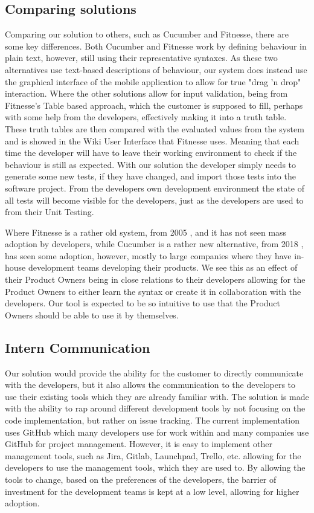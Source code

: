 \subsection{Comparing solutions}

Comparing our solution to others, such as Cucumber and Fitnesse, there are some key differences.
Both Cucumber and Fitnesse work by defining behaviour in plain text, however, still using their representative syntaxes.
As these two alternatives use text-based descriptions of behaviour, our system does instead use the graphical interface of the mobile application to allow for true "drag 'n drop" interaction.
Where the other solutions allow for input validation, being from Fitnesse's Table based approach, which the customer is supposed to fill, perhaps with some help from the developers, effectively making it into a truth table.
These truth tables are then compared with the evaluated values from the system and is showed in the Wiki User Interface that Fitnesse uses.
Meaning that each time the developer will have to leave their working environment to check if the behaviour is still as expected.
With our solution the developer simply needs to generate some new tests, if they have changed, and import those tests into the software project.
From the developers own development environment the state of all tests will become visible for the developers, just as the developers are used to from their Unit Testing.

Where Fitnesse is a rather old system, from 2005 \cite{FitnesseDownload}, and it has not seen mass adoption by developers, while Cucumber is a rather new alternative, from 2018 \cite{CucumberWiki}, has seen some adoption, however, mostly to large companies where they have in-house development teams developing their products.
We see this as an effect of their Product Owners being in close relations to their developers allowing for the Product Owners to either learn the syntax or create it in collaboration with the developers.
Our tool is expected to be so intuitive to use that the Product Owners should be able to use it by themselves.

\subsection{Intern Communication}

Our solution would provide the ability for the customer to directly communicate with the developers, but it also allows the communication to the developers to use their existing tools which they are already familiar with.
The solution is made with the ability to rap around different development tools by not focusing on the code implementation, but rather on issue tracking.
The current implementation uses GitHub which many developers use for work within and many companies use GitHub for project management.
However, it is easy to implement other management tools, such as Jira, Gitlab, Launchpad, Trello, etc. allowing for the developers to use the management tools, which they are used to.
By allowing the tools to change, based on the preferences of the developers, the barrier of investment for the development teams is kept at a low level, allowing for higher adoption.

